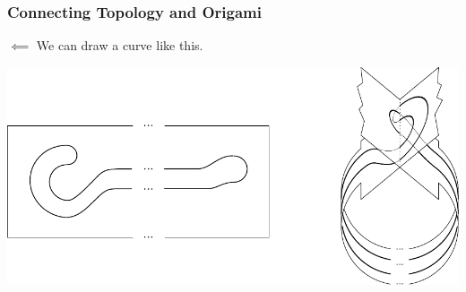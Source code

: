 \documentclass{beamer}
\begin{document}
\begin{frame}
\frametitle{Connecting Topology and Origami}
\begin{block}{$\impliedby$}
We can draw a curve like this. 
\end{block}
\begin{center}
\includegraphics[width=.7\textwidth]{knot_pix/marking-jordan.pdf}
\end{center}
\end{frame}
\end{document}
